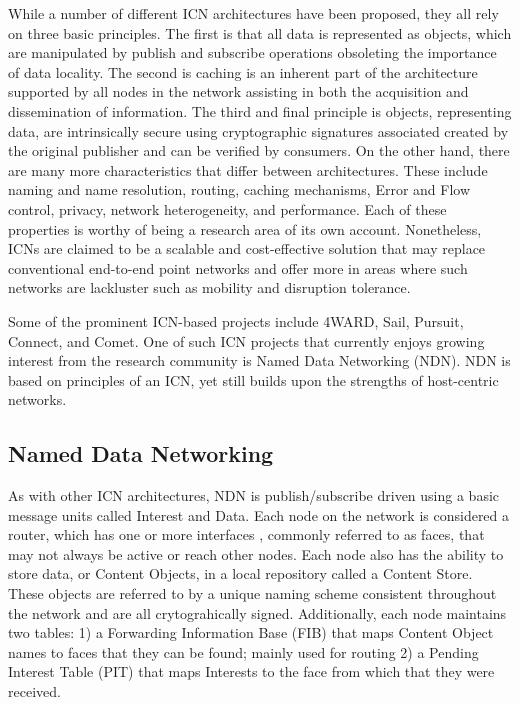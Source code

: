 \documentclass[a4paper,12pt]{report}      %
\begin{document}
While a number of different ICN architectures have been proposed, they all rely on three basic
principles. The first is that all data is represented as objects, which are manipulated by publish and
subscribe operations obsoleting the importance of data locality. The second is caching is an inherent
part of the architecture supported by all nodes in the network assisting in both the acquisition and
dissemination of information. The third and final principle is objects, representing data, are intrinsically
secure using cryptographic signatures associated created by the original publisher and can be verified
by consumers. On the other hand, there are many more characteristics that differ between architectures.
These include naming and name resolution, routing, caching mechanisms, Error and Flow control,
privacy, network heterogeneity, and performance. Each of these properties is worthy of being a research
area of its own account. \cite{hotnets} Nonetheless, ICNs are claimed to be a scalable and
cost-effective solution that may replace conventional end-to-end point networks and offer more in areas 
where such networks are lackluster such as mobility and disruption tolerance.

Some of the prominent ICN-based projects include 4WARD, Sail, Pursuit, Connect, and Comet. \cite{bond} 
One of such ICN projects that currently enjoys growing interest from the research
community is Named Data Networking (NDN). NDN is based on principles of an ICN, yet still builds
upon the strengths of host-centric networks. \cite{ndnproj}

\subsection{Named Data Networking}
As with other ICN architectures, NDN is publish/subscribe driven using a basic message units called
Interest and Data. Each node on the network is considered a router, which has one or more interfaces ,
commonly referred to as faces, that may not always be active or reach other nodes. Each node also has
the ability to store data, or Content Objects, in a local repository called a Content Store. These objects
are referred to by a unique naming scheme consistent throughout the network and are all
crytograhically signed. Additionally, each node maintains two tables: 1) a Forwarding Information Base
(FIB) that maps Content Object names to faces that they can be found; mainly used for routing 2) a
Pending Interest Table (PIT) that maps Interests to the face from which that they were received.
\end{document}
